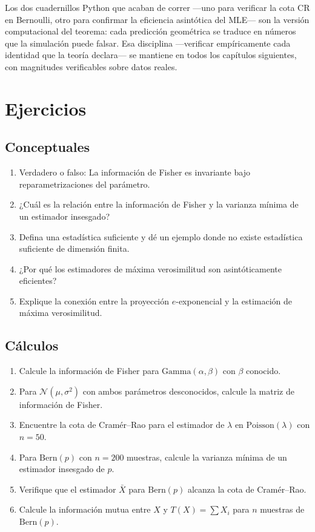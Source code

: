 \bigskip
\noindent
Los dos cuadernillos Python que acaban de correr ---uno para verificar la cota CR en Bernoulli, otro para confirmar la eficiencia asintótica del MLE--- son la versión computacional del teorema: cada predicción geométrica se traduce en números que la simulación puede falsar. Esa disciplina ---verificar empíricamente cada identidad que la teoría declara--- se mantiene en todos los capítulos siguientes, con magnitudes verificables sobre datos reales.


\section{Ejercicios}

\subsection*{Conceptuales}
\begin{enumerate}
	\item[$\star$] Verdadero o falso: La información de Fisher es invariante bajo reparametrizaciones del parámetro.
	\item[$\star$] ¿Cuál es la relación entre la información de Fisher y la varianza mínima de un estimador insesgado?
	\item[$\star$] Defina una estadística suficiente y dé un ejemplo donde no existe estadística suficiente de dimensión finita.
	\item[$\star$] ¿Por qué los estimadores de máxima verosimilitud son asintóticamente eficientes?
	\item[$\star$] Explique la conexión entre la proyección $e$-exponencial y la estimación de máxima verosimilitud.
\end{enumerate}

\subsection*{Cálculos}
\begin{enumerate}[resume]
	\item[$\star\star$] Calcule la información de Fisher para $\mathrm{Gamma}(\alpha, \beta)$ con $\beta$ conocido.
	\item[$\star\star$] Para $\mathcal{N}(\mu, \sigma^2)$ con ambos parámetros desconocidos, calcule la matriz de información de Fisher.
	\item[$\star\star$] Encuentre la cota de Cramér--Rao para el estimador de $\lambda$ en $\mathrm{Poisson}(\lambda)$ con $n = 50$.
	\item[$\star\star$] Para $\mathrm{Bern}(p)$ con $n = 200$ muestras, calcule la varianza mínima de un estimador insesgado de $p$.
	\item[$\star\star$] Verifique que el estimador $\bar{X}$ para $\mathrm{Bern}(p)$ alcanza la cota de Cramér--Rao.
	\item[$\star\star$] Calcule la información mutua entre $X$ y $T(X) = \sum X_i$ para $n$ muestras de $\mathrm{Bern}(p)$.
\end{enumerate}

